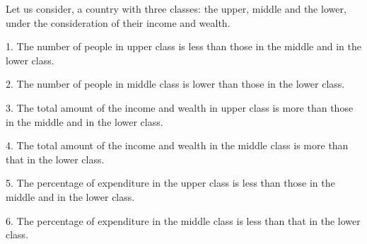 \documentclass[12pt,a4paper]{article}
\begin{document}
	Let us consider, a country with three classes: the upper, middle and the lower, under the consideration of their income and wealth.
     
    1. The number of people in upper class is less than those in the middle and in the lower class.
    
    2. The number of people in middle class is lower than those in the lower class.
    
    3. The total amount of the income and wealth in upper class is more than those in the middle and in the lower class.
    
    4. The total amount of the income and wealth in the middle class is more than that in the lower class. 
    
    5. The percentage of expenditure in the upper class is less than those in the middle and in the lower class.
    
    6. The percentage of expenditure in the middle class is less than that in the lower class.		
		
			
\end{document}
